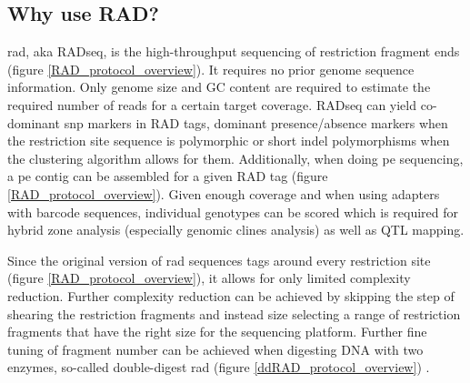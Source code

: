 \documentclass[a4paper,12pt,times,print,index, custombib]{PhDThesisPSnPDF}\usepackage[]{graphicx}\usepackage[]{color}
\begin{document}
\subsection{Why use RAD?}
\gls{rad}, aka RADseq, is the high-throughput sequencing of restriction fragment ends (figure \ref{RAD_protocol_overview}). It requires no prior genome sequence information. Only genome size and GC content are required to estimate the required number of reads for a certain target coverage. 
RADseq can yield co-dominant \gls{snp} markers in \glspl{RAD tag}, dominant presence/absence markers when the restriction site sequence is polymorphic or short indel polymorphisms when the clustering algorithm allows for them. Additionally, when doing \gls{pe} sequencing, a \gls{pe} contig can be assembled for a given \gls{RAD tag} (figure \ref{RAD_protocol_overview}).
Given enough coverage and when using adapters with barcode sequences, individual genotypes can be scored which is required for hybrid zone analysis (especially genomic clines analysis) as well as QTL mapping. 

Since the original version of \gls{rad} sequences tags around every restriction site (figure \ref{RAD_protocol_overview}), it allows for only limited complexity reduction. Further complexity reduction can be achieved by skipping the step of shearing the restriction fragments and instead size selecting a range of restriction fragments that have the right size for the sequencing platform. Further fine tuning of fragment number can be achieved when digesting DNA with two enzymes, so-called double-digest \gls{rad} (figure \ref{ddRAD_protocol_overview}) \citep{Peterson2012}.
\end{document}
